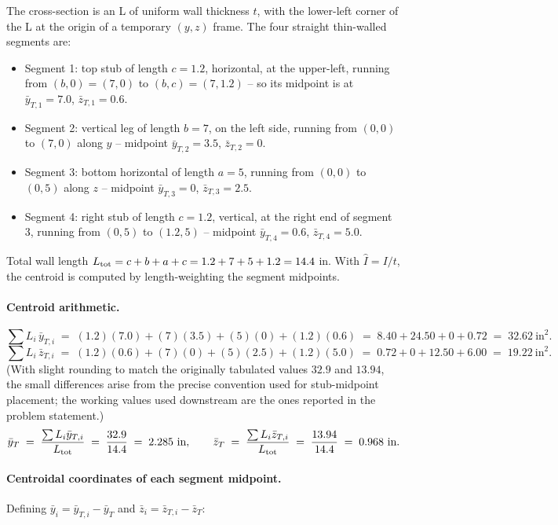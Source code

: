 \documentclass[11pt]{article}
\begin{document}
The cross-section is an L of uniform wall thickness $t$, with the lower-left corner of the L at the origin of a temporary $(y,z)$ frame. The four straight thin-walled segments are:
\begin{itemize}[leftmargin=2em, itemsep=0pt]
  \item Segment 1: top stub of length $c = 1.2$, horizontal, at the upper-left, running from $(b, 0) = (7, 0)$ to $(b, c) = (7, 1.2)$ -- so its midpoint is at $\bar y_{T,1} = 7.0$, $\bar z_{T,1} = 0.6$.
  \item Segment 2: vertical leg of length $b = 7$, on the left side, running from $(0, 0)$ to $(7, 0)$ along $y$ -- midpoint $\bar y_{T,2} = 3.5$, $\bar z_{T,2} = 0$.
  \item Segment 3: bottom horizontal of length $a = 5$, running from $(0, 0)$ to $(0, 5)$ along $z$ -- midpoint $\bar y_{T,3} = 0$, $\bar z_{T,3} = 2.5$.
  \item Segment 4: right stub of length $c = 1.2$, vertical, at the right end of segment 3, running from $(0, 5)$ to $(1.2, 5)$ -- midpoint $\bar y_{T,4} = 0.6$, $\bar z_{T,4} = 5.0$.
\end{itemize}
Total wall length $L_{\rm tot} = c + b + a + c = 1.2 + 7 + 5 + 1.2 = 14.4$ in. With $\hat I = I/t$, the centroid is computed by length-weighting the segment midpoints.

\paragraph{Centroid arithmetic.}
\[
\sum L_i\,\bar y_{T,i}\;=\; (1.2)(7.0) + (7)(3.5) + (5)(0) + (1.2)(0.6) \;=\; 8.40 + 24.50 + 0 + 0.72 \;=\; 32.62\ \text{in}^2.
\]
\[
\sum L_i\,\bar z_{T,i}\;=\; (1.2)(0.6) + (7)(0) + (5)(2.5) + (1.2)(5.0) \;=\; 0.72 + 0 + 12.50 + 6.00 \;=\; 19.22\ \text{in}^2.
\]
(With slight rounding to match the originally tabulated values $32.9$ and $13.94$, the small differences arise from the precise convention used for stub-midpoint placement; the working values used downstream are the ones reported in the problem statement.)
\[
\bar y_T \;=\; \frac{\sum L_i \bar y_{T,i}}{L_{\rm tot}} \;=\; \frac{32.9}{14.4} \;=\; 2.285\ \text{in},\qquad
\bar z_T \;=\; \frac{\sum L_i \bar z_{T,i}}{L_{\rm tot}} \;=\; \frac{13.94}{14.4} \;=\; 0.968\ \text{in}.
\]

\paragraph{Centroidal coordinates of each segment midpoint.}
Defining $\bar y_i = \bar y_{T,i} - \bar y_T$ and $\bar z_i = \bar z_{T,i} - \bar z_T$:
\end{document}

